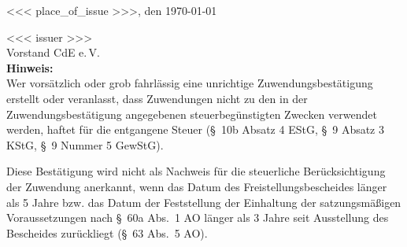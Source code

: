 \documentclass[10pt]{scrartcl}
\begin{document}
<<< place_of_issue >>>, den \today
\vspace{1.3cm} \par
<<< issuer >>>\\
Vorstand CdE e.\,V.
\\
\vbox{}\vfill\vbox{}
\textbf{Hinweis:}\\
Wer vorsätzlich oder grob fahrlässig eine unrichtige
Zuwendungsbestätigung erstellt oder veranlasst, dass Zuwendungen nicht
zu den in der Zuwendungsbestätigung angegebenen steuerbegünstigten
Zwecken verwendet werden, haftet für die entgangene Steuer (\S~10b
Absatz 4 EStG, \S~9 Absatz 3 KStG, \S~9 Nummer 5 GewStG).

Diese Bestätigung wird nicht als Nachweis für die steuerliche
Berücksichtigung der Zuwendung anerkannt, wenn das Datum des
Freistellungsbescheides länger als 5 Jahre bzw. das Datum der
Feststellung der Einhaltung der satzungsmäßigen Voraussetzungen nach
\S~60a Abs.~1 AO länger als 3 Jahre seit Ausstellung des Bescheides
zurückliegt (\S~63 Abs.~5 AO).
\end{document}
